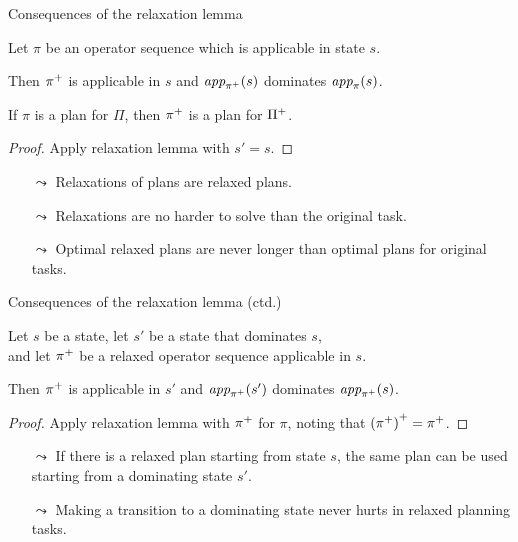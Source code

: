 \documentclass{gkibeamer}
\begin{document}
\begin{frame}{Consequences of the relaxation lemma}
  \begin{corollary}
    Let $\pi$ be an operator sequence which is applicable in state
    $s$.
    
    Then ${\pi}^+$ is applicable in $s$ and
    $\textit{app}_{{\pi}^+}(s)$ dominates
    $\textit{app}_{\pi}(s)$.

    If $\pi$ is a plan for $\Pi$, then ${\pi}^+$ is a plan
    for ${\Pi}^+$.
  \end{corollary}

  \begin{proof}
    Apply relaxation lemma with $s' = s$.
  \end{proof}

  \begin{itemize}
  \item[$\leadsto$] Relaxations of plans are relaxed plans.
  \item[$\leadsto$] Relaxations are no harder to solve than the
    original task.
  \item[$\leadsto$] Optimal relaxed plans are never longer
    than optimal plans for original tasks.
  \end{itemize}
\end{frame}

\begin{frame}{Consequences of the relaxation lemma (ctd.)}
  \begin{corollary}
    Let $s$ be a state, let $s'$ be a state that dominates $s$, \\
    and let ${\pi}^+$ be a relaxed operator sequence
    applicable in $s$.
    
    Then ${\pi}^+$ is applicable in $s'$ and
    $\textit{app}_{{\pi}^+}(s')$ dominates
    $\textit{app}_{{\pi}^+}(s)$.
  \end{corollary}

  \begin{proof}
    Apply relaxation lemma with ${\pi}^+$ for $\pi$,
    noting that ${({\pi}^+)}^+ = {\pi}^+$.
  \end{proof}

  \begin{itemize}
  \item[$\leadsto$] If there is a relaxed plan starting from state
    $s$, the same plan can be used starting from a dominating state
    $s'$.
  \item[$\leadsto$] Making a transition to a dominating state never
    hurts in relaxed planning tasks.
  \end{itemize}
\end{frame}
\end{document}
